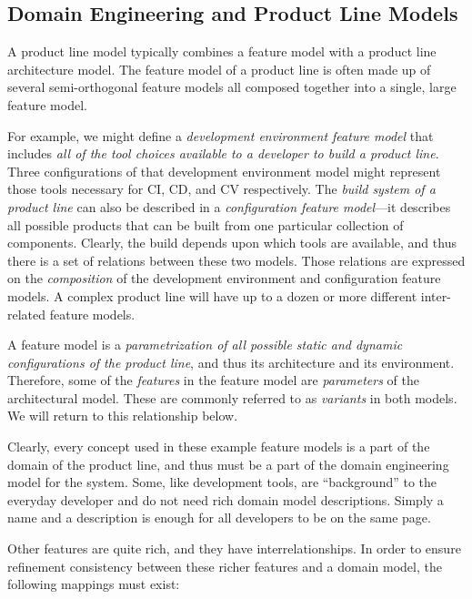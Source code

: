 \documentclass[10pt,letterpaper]{article}
\begin{document}
\subsection{Domain Engineering and Product Line Models}
\label{domain-engineering-and-product-line-models}

A product line model typically combines a feature model with a product line architecture model. The feature model of a product line is often made up of several semi-orthogonal feature models all composed together into a single, large feature model.

For example, we might define a \emph{development environment feature model} that includes \emph{all of the tool choices available to a developer to build a product line}. Three configurations of that development environment model might represent those tools necessary for CI, CD, and CV respectively. The \emph{build system of a product line} can also be described in a \emph{configuration feature model}---it describes all possible products that can be built from one particular collection of components. Clearly, the build depends upon which tools are available, and thus there is a set of relations between these two models. Those relations are expressed on the \emph{composition} of the development environment and configuration feature models. A complex product line will have up to a dozen or more different inter-related feature models.

A feature model is a \emph{parametrization of all possible static and dynamic configurations of the product line}, and thus its architecture and its environment. Therefore, some of the \emph{features} in the feature model are \emph{parameters} of the architectural model. These are commonly referred to as \emph{variants} in both models. We will return to this relationship below.

Clearly, every concept used in these example feature models is a part of the domain of the product line, and thus must be a part of the domain engineering model for the system. Some, like development tools, are ``background'' to the everyday developer and do not need rich domain model descriptions. Simply a name and a description is enough for all developers to be on the same page.

Other features are quite rich, and they have interrelationships. In order to ensure refinement consistency between these richer features and a domain model, the following mappings must exist:
\end{document}
